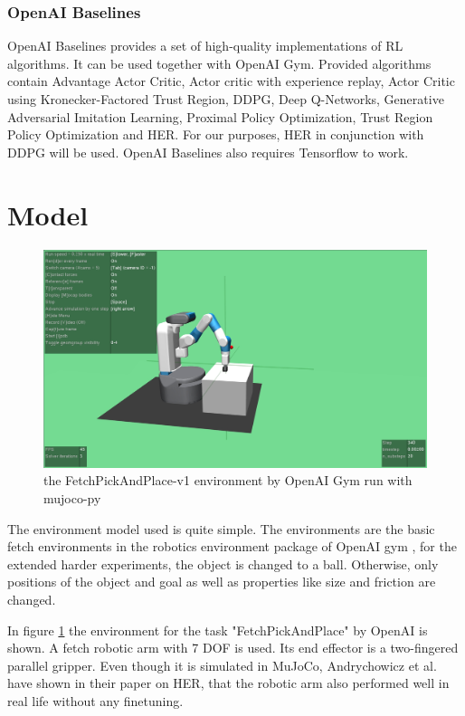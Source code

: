 \subsubsection{OpenAI Baselines}
OpenAI Baselines provides a set of high-quality implementations of RL algorithms. It can be used together with OpenAI Gym. Provided algorithms contain Advantage Actor Critic, Actor critic with experience replay, Actor Critic using Kronecker-Factored Trust Region, DDPG, Deep Q-Networks, Generative Adversarial Imitation Learning, Proximal Policy Optimization, Trust Region Policy Optimization and HER.
For our purposes, HER in conjunction with DDPG will be used. 
OpenAI Baselines also requires Tensorflow to work.

\section{Model}

\begin{figure} [h]
	\centering
	\includegraphics[width=1\textwidth]{figures/FetchPickAndPlace-v1.png}
	\caption{the FetchPickAndPlace-v1 environment by OpenAI Gym run with mujoco-py}
	\label{pickplace1}
\end{figure}

The environment model used is quite simple. The environments are the basic fetch environments in the robotics environment package of OpenAI gym \cite{plappert}, for the extended harder experiments, the object is changed to a ball. Otherwise, only positions of the object and goal as well as properties like size and friction are changed.

\vspace{0.5cm}

In figure \ref{pickplace1} the environment for the task "FetchPickAndPlace" by OpenAI is shown. A fetch robotic arm with 7 DOF is used. Its end effector is a two-fingered parallel gripper. Even though it is simulated in MuJoCo, Andrychowicz et al. have shown in their paper on HER, that the robotic arm also performed well in real life without any finetuning. \cite{herpaper}


